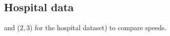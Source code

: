 \documentclass[bimj,fleqn]{w-art}\usepackage[]{graphicx}\usepackage[]{color}
\theoremstyle{plain}
\theoremstyle{definition}
\begin{document}
\subsection{Hospital data}
\label{sec:hosp_data}

 and ($2, 3$) for the hospital dataset) to compare speeds.


% 
% 
% 
% 
\end{document}
